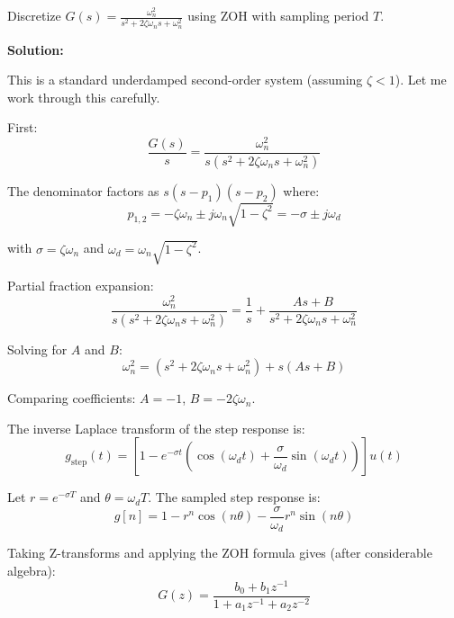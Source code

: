 \begin{example}
\label{ex:zoh_second_order}

Discretize $G(s) = \frac{\omega_n^2}{s^2 + 2\zeta\omega_n s + \omega_n^2}$ using ZOH with sampling period $T$.

\textbf{Solution:}

This is a standard underdamped second-order system (assuming $\zeta < 1$). Let me work through this carefully.

First:
\begin{equation}
\frac{G(s)}{s} = \frac{\omega_n^2}{s(s^2 + 2\zeta\omega_n s + \omega_n^2)}
\end{equation}

The denominator factors as $s(s - p_1)(s - p_2)$ where:
\begin{equation}
p_{1,2} = -\zeta\omega_n \pm j\omega_n\sqrt{1-\zeta^2} = -\sigma \pm j\omega_d
\end{equation}

with $\sigma = \zeta\omega_n$ and $\omega_d = \omega_n\sqrt{1-\zeta^2}$.

Partial fraction expansion:
\begin{equation}
\frac{\omega_n^2}{s(s^2 + 2\zeta\omega_n s + \omega_n^2)} = \frac{1}{s} + \frac{As + B}{s^2 + 2\zeta\omega_n s + \omega_n^2}
\end{equation}

Solving for $A$ and $B$:
\begin{equation}
\omega_n^2 = (s^2 + 2\zeta\omega_n s + \omega_n^2) + s(As + B)
\end{equation}

Comparing coefficients: $A = -1$, $B = -2\zeta\omega_n$.

The inverse Laplace transform of the step response is:
\begin{equation}
g_{\text{step}}(t) = \left[1 - e^{-\sigma t}\left(\cos(\omega_d t) + \frac{\sigma}{\omega_d}\sin(\omega_d t)\right)\right] u(t)
\end{equation}

Let $r = e^{-\sigma T}$ and $\theta = \omega_d T$. The sampled step response is:
\begin{equation}
g[n] = 1 - r^n \cos(n\theta) - \frac{\sigma}{\omega_d} r^n \sin(n\theta)
\end{equation}

Taking Z-transforms and applying the ZOH formula gives (after considerable algebra):
\begin{equation}
\boxed{G(z) = \frac{b_0 + b_1 z^{-1}}{1 + a_1 z^{-1} + a_2 z^{-2}}}
\end{equation}


\end{example}
